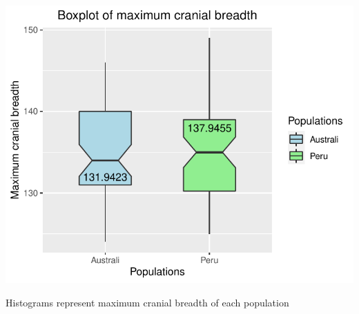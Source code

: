 \documentclass[12pt, oneside]{report}\usepackage[]{graphicx}\usepackage[]{color}
\makeatletter
\def\maxwidth{ %
  \ifdim\Gin@nat@width>\linewidth
    \linewidth
  \else
    \Gin@nat@width
  \fi
}
\makeatother
\begin{document}
\begin{Schunk}


{\centering \includegraphics[width=\maxwidth]{figure/unnamed-chunk-7-1} 

}

\end{Schunk}

\begin{center}
Histograms represent maximum cranial breadth of each population \\
\end{center}
\end{document}
